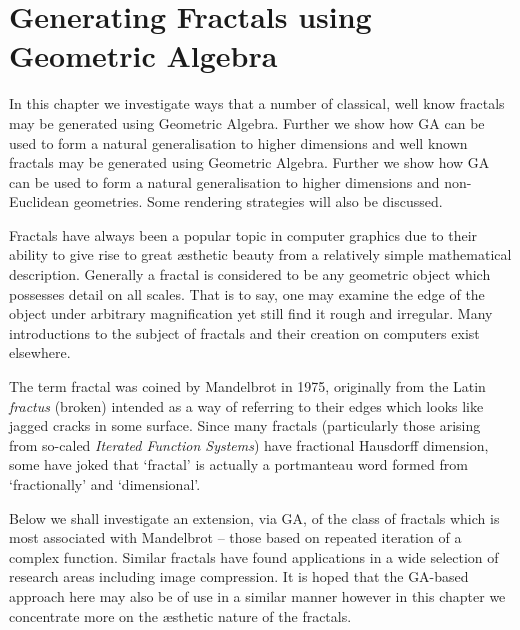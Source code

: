 \begin{savequote}
\end{savequote}

\chapter{Generating Fractals using Geometric Algebra}
\label{chap:fractals}

In this chapter we investigate ways that a number of classical, well know
fractals may be generated using Geometric Algebra. Further we show how
GA can be used to form a natural generalisation to higher dimensions and
well known fractals may be generated using Geometric Algebra. Further we show
how GA can be used to form a natural generalisation to higher dimensions and
non-Euclidean geometries. Some rendering strategies will also be discussed.

Fractals have always been a popular topic in computer graphics due to their
ability to give rise to great \ae sthetic beauty from a relatively simple
mathematical description. Generally a fractal is considered to be any
geometric object which possesses detail on all
scales\cite{FRAC:FractalsEverywhere, FRAC:FractalGeometryOfNature}. That is to
say, one may examine the edge of the object under arbitrary magnification
yet still find it rough and irregular. Many introductions to the subject of
fractals and their creation on computers exist elsewhere\cite{FRAC:FractalGeometry,
  FRAC:ChaosAndFractals, FRAC:FractalImages}.

The term fractal was coined by Mandelbrot\cite{FRAC:LesObjetsFractals} in 1975,
originally from the Latin {\em fractus} (broken) intended as a way of referring
to their edges which looks like jagged cracks in some surface. Since many
fractals (particularly those arising from so-caled \emph{Iterated Function Systems}) have
fractional Hausdorff dimension\cite{FRAC:GeometryOfFractalSets},
some have joked that `fractal' is actually a portmanteau word formed from
`fractionally' and `dimensional'.

Below we shall investigate an extension, via GA, of the class of fractals 
which is most associated with Mandelbrot -- those based on repeated iteration
of a complex function.  Similar fractals have found applications in a wide
selection of research areas including image 
compression\cite{Barnsley88c,Barnsley93b}.%
It is hoped that the GA-based approach here may
also be of use in a similar manner however in this chapter we concentrate more
on the \ae sthetic nature of the fractals.

